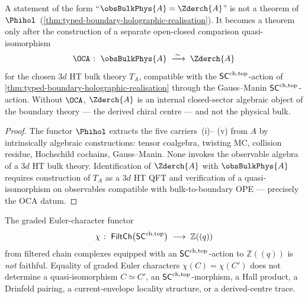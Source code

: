 \begin{corollary}
\label{cor:sixth-carrier-OCA}
%
%
A statement of the form ``$\obsBulkPhys{A} = \Zderch{A}$'' is not a
theorem of $\Phihol$~(\cref{thm:typed-boundary-holographic-realisation}).
It becomes a theorem only after the construction of a separate
open-closed comparison quasi-isomorphism
\begin{equation}\label{eq:OCA-quasi-iso}
 \OCA \;\colon\; \obsBulkPhys{A} \;\xrightarrow{\;\sim\;}\; \Zderch{A}
\end{equation}
for the chosen $3d$ HT bulk theory $T_{A}$, compatible with the
$\mathsf{SC}^{\mathrm{ch},\mathrm{top}}$-action of
\cref{thm:typed-boundary-holographic-realisation} through the
Gauss--Manin $\mathsf{SC}^{\mathrm{ch},\mathrm{top}}$-action.  Without
$\OCA$, $\Zderch{A}$ is an internal closed-sector algebraic object
of the boundary theory --- the derived chiral centre --- and not the
physical bulk.
\end{corollary}

\begin{proof}
The functor $\Phihol$ extracts the five carriers~\textup{(i)}--%
\textup{(v)} from $A$ by intrinsically algebraic constructions:
tensor coalgebra, twisting MC, collision residue, Hochschild cochains,
Gauss--Manin.  None invokes the observable algebra of a $3d$ HT bulk
theory.  Identification of $\Zderch{A}$ with $\obsBulkPhys{A}$
requires construction of $T_{A}$ as a $3d$ HT QFT and verification of
a quasi-isomorphism on observables compatible with bulk-to-boundary
OPE --- precisely the OCA datum.
\end{proof}

\begin{lemma}
\label{lem:scalar-non-faithfulness}
%
%
The graded Euler-character functor
\[
 \chi \;\colon\;
 \mathsf{FiltCh}\bigl(\mathsf{SC}^{\mathrm{ch},\mathrm{top}}\bigr)
 \;\longrightarrow\; \mathbb{Z}((q))
\]
from filtered chain complexes equipped with an $\mathsf{SC}^{\mathrm{ch},\mathrm{top}}$-action to
$\mathbb{Z}((q))$ is \emph{not} faithful.  Equality of graded Euler
characters $\chi(C) = \chi(C')$ does not determine a quasi-isomorphism
$C \simeq C'$, an $\mathsf{SC}^{\mathrm{ch},\mathrm{top}}$-morphism, a Hall product, a Drinfeld
pairing, a current-envelope locality structure, or a derived-centre
trace.
\end{lemma}

